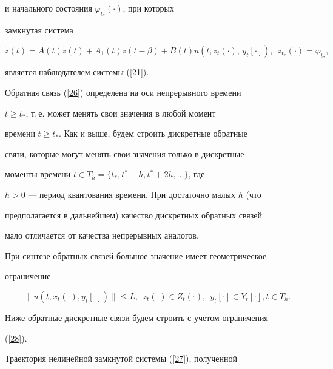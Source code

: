 и начального состояния $\varphi_{t_*}(\cdot)$, при которых


замкнутая система


\begin{equation}\label{27}


\Dot z(t) =A(t)z(t)+A_1(t)z(t-\beta)+B(t)u(t,z_{t}(\cdot),


\, y_t[\cdot]),\ \  z_{t_*}(\cdot)=\varphi_{t_*},


\end{equation}


является наблюдателем системы (\ref{21}).





Обратная связь (\ref{26}) определена на оси непрерывного времени


$t \ge t_*$, т.\,е. может менять свои значения в любой момент


времени $t \ge t_*$. Как и выше, будем строить дискретные обратные


связи, которые могут менять свои значения только в дискретные


моменты времени $t \in T_{h}=\{t_*,t^*+h,t^*+2h, \dotsc\}$, где


$h>0$ --- период квантования времени. При достаточно малых $h$ (что


предполагается в дальнейшем) качество дискретных обратных связей


мало отличается от качества непрерывных аналогов.





При синтезе обратных связей большое значение имеет геометрическое


ограничение


\begin{equation}\label{28}


\|u(t, x_t(\cdot), y_t[\cdot])\| \le L,\ \ z_t(\cdot) \in


Z_{t}(\cdot),\ \ y _{t}[\cdot] \in Y_t[\cdot], t \in T_h.


\end{equation}





Ниже обратные дискретные связи будем строить с учетом ограничения


(\ref{28}).





Траектория нелинейной замкнутой системы (\ref{27}), полученной


